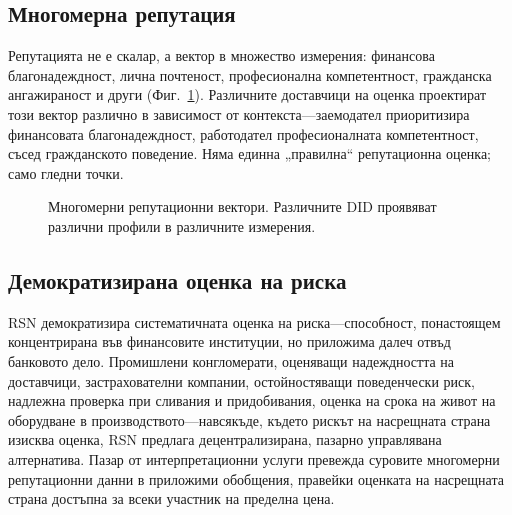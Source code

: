 \documentclass[11pt,a4paper,twocolumn]{article}
\begin{document}
\subsection{Многомерна репутация}

Репутацията не е скалар, а вектор в множество измерения: финансова благонадеждност, лична почтеност, професионална компетентност, гражданска ангажираност и други (Фиг.~\ref{fig:reputation-radar}). Различните доставчици на оценка проектират този вектор различно в зависимост от контекста---заемодател приоритизира финансовата благонадеждност, работодател професионалната компетентност, съсед гражданското поведение. Няма единна „правилна“ репутационна оценка; само гледни точки.

\begin{figure}[ht]
\centering
{}
\caption{Многомерни репутационни вектори. Различните DID проявяват различни профили в различните измерения.}
\label{fig:reputation-radar}
\end{figure}

\subsection{Демократизирана оценка на риска}

RSN демократизира систематичната оценка на риска---способност, понастоящем концентрирана във финансовите институции, но приложима далеч отвъд банковото дело. Промишлени конгломерати, оценяващи надеждността на доставчици, застрахователни компании, остойностяващи поведенчески риск, надлежна проверка при сливания и придобивания, оценка на срока на живот на оборудване в производството---навсякъде, където рискът на насрещната страна изисква оценка, RSN предлага децентрализирана, пазарно управлявана алтернатива. Пазар от интерпретационни услуги превежда суровите многомерни репутационни данни в приложими обобщения, правейки оценката на насрещната страна достъпна за всеки участник на пределна цена.
\end{document}
